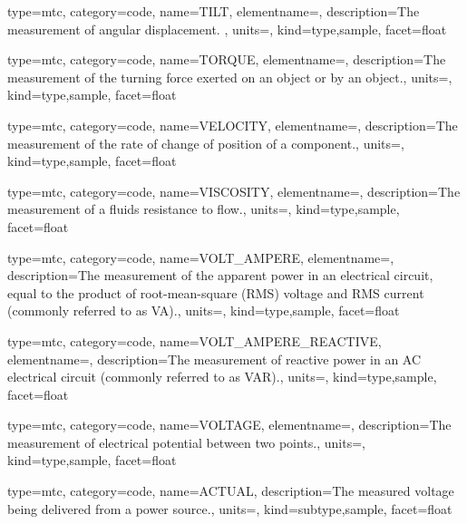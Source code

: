 {
  type=mtc,
  category=code,
  name={TILT},
  elementname=,
  description={The measurement of angular displacement. },
  units=,
  kind={type,sample},
  facet={\gls{float}}
}


{
  type=mtc,
  category=code,
  name={TORQUE},
  elementname=,
  description={The measurement of the turning force exerted on an object or by an object.},
  units=,
  kind={type,sample},
  facet={\gls{float}}
}


{
  type=mtc,
  category=code,
  name={VELOCITY},
  elementname=,
  description={The measurement of the rate of change of position of a \gls{component}.},
  units=,
  kind={type,sample},
  facet={\gls{float}}
}


{
  type=mtc,
  category=code,
  name={VISCOSITY},
  elementname=,
  description={The measurement of a fluids resistance to flow.},
  units=,
  kind={type,sample},
  facet={\gls{float}}
}


{
  type=mtc,
  category=code,
  name={VOLT\_AMPERE},
  elementname=,
  description={The measurement of the apparent power in an electrical circuit, equal to the product of root-mean-square (RMS) voltage and RMS current (commonly referred to as VA).},
  units=,
  kind={type,sample},
  facet={\gls{float}}
}


{
  type=mtc,
  category=code,
  name={VOLT\_AMPERE\_REACTIVE},
  elementname=,
  description={The measurement of reactive power in an AC electrical circuit (commonly referred to as VAR).},
  units=,
  kind={type,sample},
  facet={\gls{float}}
}


{
  type=mtc,
  category=code,
  name={VOLTAGE},
  elementname=,
  description={The measurement of electrical potential between two points.},
  units=,
  kind={type,sample},
  facet={\gls{float}}
}


{
  type=mtc,
  category=code,
  name={ACTUAL},
  description={The measured voltage being delivered from a power source.},
  units=,
  kind={subtype,sample},
  facet={\gls{float}}
}


